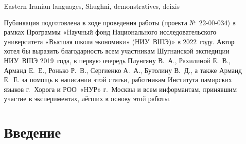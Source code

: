 \begin{eng-keywords}
Eastern Iranian languages, Shughni, demonstratives, deixis
\end{eng-keywords}

\begin{acknowledgements}
Публикация подготовлена в ходе проведения работы (проекта №~22-00-034) в рамках Программы «Научный фонд Национального исследовательского университета «Высшая школа экономики» (НИУ~ВШЭ)» в 2022~году. Автор хотел бы выразить благодарность всем участникам Шугнанской экспедиции НИУ~ВШЭ 2019~года, в первую очередь Плунгяну В.~А., Рахилиной Е.~В., Арманд Е.~Е., Ронько Р.~В., Сергиенко А.~А., Бутолину В.~Д., а также Арманд Е.~Е. за помощь в написании этой статьи, работникам Института памирских языков г.~Хорога и РОО~«НУР» г.~Москвы и всем информантам, принявшим участие в экспериментах, лёгших в основу этой работы.
\end{acknowledgements}

\begin{initialprint}
\end{initialprint}

\section{Введение} \label{dem-intro}

